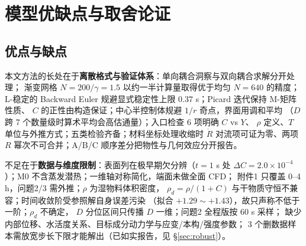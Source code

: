 \section{模型优缺点与取舍论证}

\subsection{优点与缺点}

本文方法的长处在于\textbf{离散格式与验证体系}：单向耦合洞察与双向耦合求解分开处理；
渐变网格 $N=200/\gamma=1.5$ 以约一半计算量取得优于均匀 $N=640$ 的精度；
L-稳定的 Backward Euler 规避显式稳定性上限 $0.37$ s；Picard 迭代保持 M-矩阵性质、
$C$ 的正性由构造保证；中心半控制体规避 $1/r$ 奇点，界面用调和平均
（$D$ 跨 7 个数量级时算术平均会高估通量）；入口检查 6 项明确 $C$ vs $Y$、
$\rho$ 定义、$T$ 单位与外推方式；五类检验齐备；材料坐标处理收缩时
$\dot R$ 对流项可证为零、两项 $R$ 幂次不可合并；A/B/C 顺序差分把物性与几何效应分开报告。

不足在于\textbf{数据与维度限制}：表面列在极早期欠分辨（$t=1$ s 处
$\Delta C=2.0\times10^{-4}$）；M0 不含蒸发潜热；一维轴对称简化，端面未做全面 CFD；
附件1 只覆盖 0--4 h，问题2/3 需外推；$\rho$ 为湿物料体积密度，
$\rho_d=\rho/(1+C)$ 与干物质守恒不兼容；时间收敛阶受参照解自身误差污染
（拟合 $+1.29\sim+1.43$），故只声称不低于一阶；$\rho_d$ 不确定，
$D$ 分位区间只传播 $D$ 一维；问题2 全程版按 60 s 采样；
缺少内部位移、水活度关系、目标成分动力学与应变/本构/强度参数；
3 个删数据样本需放宽步长下限才能解出（已如实报告，见 \S\ref{sec:robust}）。



